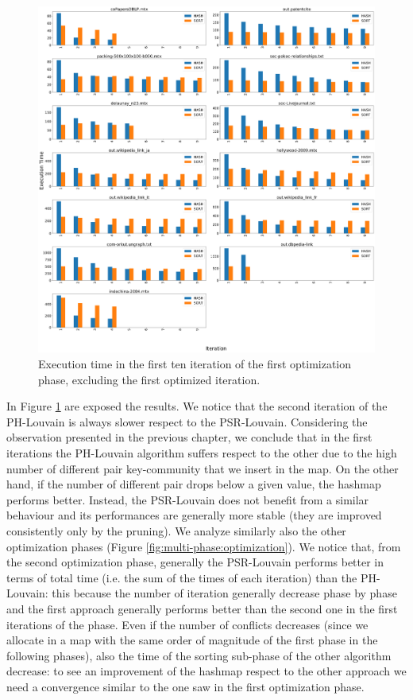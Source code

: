 \begin{figure}[t!]
	\centering
	\includegraphics[width=1\linewidth]{0-resources/hash-vs-sort}
	\caption{Execution time in the first ten iteration of the first optimization phase, excluding the first optimized iteration.}
	\label{fig:hash-vs-sort}
\end{figure}
In Figure \ref{fig:hash-vs-sort} are exposed the results. We notice that the second iteration of the PH-Louvain is always slower respect to the PSR-Louvain.
Considering the observation presented in the previous chapter, we conclude that in the first iterations the PH-Louvain algorithm suffers respect to the other due to the high number of different pair key-community that we insert in the map. 
On the other hand, if the number of different pair drops below a given value, the hashmap performs better.
Instead, the PSR-Louvain does not benefit from a similar behaviour and its performances are generally more stable (they are improved consistently only by the pruning). 
We analyze similarly also the other optimization phases (Figure \ref{fig:multi-phase:optimization}). 
We notice that, from the second optimization phase, generally the PSR-Louvain performs better in terms of total time (i.e. the sum of the times of each iteration) than the PH-Louvain: this because the number of iteration generally decrease phase by phase and the first approach generally performs better than the second one in the first iterations of the phase. Even if the number of conflicts decreases (since we allocate in a map with the same order of magnitude of the first phase in the following phases), also the time of the sorting sub-phase of the other algorithm decrease: to see an improvement of the hashmap respect to the other approach we need a convergence similar to the one saw in the first optimization phase.
